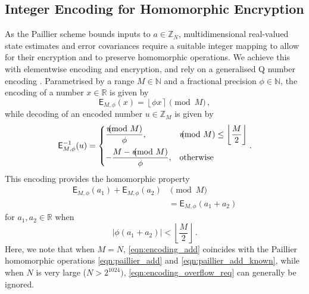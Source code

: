 \documentclass[letterpaper, 10 pt, conference]{ieeeconf}
\begin{document}
\subsection{Integer Encoding for Homomorphic Encryption}\label{subsec:encoding}
As the Paillier scheme bounds inputs to $a\in \mathbb{Z}_N$, multidimensional real-valued state estimates and error covariances require a suitable integer mapping to allow for their encryption and to preserve homomorphic operations. We achieve this with elementwise encoding and encryption, and rely on a generalised Q number encoding \cite{oberstarFixedPointRepresentationFractional2007}. Parametrised by a range $M\in \mathbb{N}$ and a fractional precision $\phi \in \mathbb{N}$, the encoding of a number $x\in\mathbb{R}$ is given by
\begin{equation}
    \mathsf{E}_{M,\phi}(x) = \left\lfloor \phi x \right\rceil \pmod{M}\,,
\end{equation}
while decoding of an encoded number $u\in\mathbb{Z}_M$ is given by
\begin{equation}
    \mathsf{E}^{-1}_{M,\phi}(u) =
    \begin{dcases}
        \frac{u \hspace{-8pt}\pmod{M}}{\phi}, &u \hspace{-8pt}\pmod{M} \leq \left\lfloor\frac{M}{2}\right\rfloor \\
        -\frac{M - u \hspace{-8pt}\pmod{M}}{\phi}, & \text{otherwise} \\
    \end{dcases}.
\end{equation}
This encoding provides the homomorphic property
\begin{equation}\label{eqn:encoding_add}
    \begin{split}
        \mathsf{E}_{M,\phi}(a_1) + \mathsf{E}_{M,\phi}(a_2)& \pmod{M}\\
        &= \mathsf{E}_{M,\phi}(a_1+a_2)
    \end{split}
\end{equation}
for $a_1,a_2\in\mathbb{R}$ when
\begin{equation}\label{eqn:encoding_overflow_req}
    \left|\phi(a_1+a_2)\right| < \left\lfloor \frac{M}{2} \right\rfloor\,.
\end{equation}
Here, we note that when $M=N$, \eqref{eqn:encoding_add} coincides with the Paillier homomorphic operations \eqref{eqn:paillier_add} and \eqref{eqn:paillier_add_known}, while when $N$ is very large ($N>2^{1024})$, \eqref{eqn:encoding_overflow_req} can generally be ignored.
\end{document}
